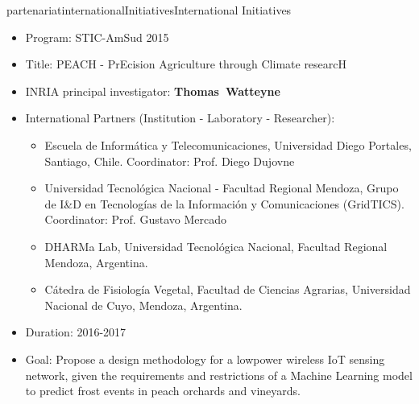 \documentclass{ra2016}
\newcommand{\thomas}           {\textbf{Thomas~Watteyne}}
\begin{document}
\begin{module}{partenariat}{internationalInitiatives}{International Initiatives}
\begin{itemize}
    \item Program: STIC-AmSud 2015
    \item Title: PEACH - PrEcision Agriculture through Climate researcH
    \item INRIA principal investigator: \thomas
    \item International Partners (Institution -  Laboratory - Researcher):
        \begin{itemize}
            \item Escuela de Inform\'atica y Telecomunicaciones, Universidad Diego Portales, Santiago, Chile. Coordinator: Prof. Diego Dujovne
            \item Universidad Tecnol\'ogica Nacional - Facultad Regional Mendoza, Grupo de I\&D en Tecnologías de la Información y Comunicaciones (GridTICS). Coordinator: Prof. Gustavo Mercado
            \item DHARMa Lab, Universidad Tecnol\'ogica Nacional, Facultad Regional Mendoza, Argentina.
            \item C\'atedra de Fisiolog\'ia Vegetal, Facultad de Ciencias Agrarias, Universidad Nacional de Cuyo, Mendoza, Argentina.
        \end{itemize}
    \item Duration: 2016-2017
    \item Goal: Propose a design methodology for a low­power wireless IoT sensing network, given the requirements and restrictions of a Machine Learning model to predict frost events in peach orchards and vineyards.
\end{itemize}

\end{module}
\end{document}
